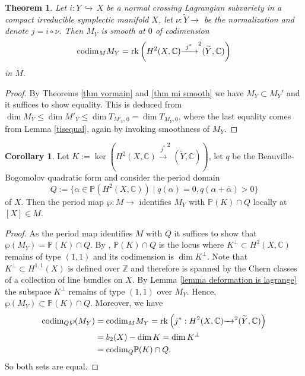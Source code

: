\documentclass[a4paper,11pt,final]{amsart}
\theoremstyle{plain}
\newtheorem{Thm}[subsection]{Theorem}
\theoremstyle{definition}
\newtheorem{Cor}[subsection]{Corollary}
\numberwithin{equation}{section}
\theoremstyle{remark}
\begin{document}
\begin{Thm}\label{thm main}
Let $i:Y {{\, \hookrightarrow\,}} X$ be a normal crossing Lagrangian subvariety in a compact irreducible symplectic manifold 
$X$, let $\nu:{{\widetilde{Y}}}{\xrightarrow{\ \ }}$ be the normalization and denote $j=i\circ\nu$. Then $M_Y$ is smooth at $0$ of codimension
\begin{equation}\label{codim}
{\operatorname{codim}}_M M_Y = {{\rm rk}}\left(H^2(X,{{\mathbb C}}) {\xrightarrow{\ j^*\ }}^2({{\widetilde{Y}}},{{\mathbb C}})\right)
\end{equation}
in $M$.
\end{Thm}
\begin{proof}
By Theorems \ref{thm vormain} and \ref{thm mi smooth} we have $M_Y \subset M_Y'$ and it suffices to show equality. This is deduced from $\dim M_Y \leq \dim M'_{Y} \leq \dim T_{M'_Y,0} = \dim T_{M_Y,0}$,
where the last equality comes from Lemma \ref{tisequal}, again by invoking smoothness of $M_Y$. 
\end{proof}
\begin{Cor}\label{cor main}
Let $K:=\ker\left(H^2(X,{{\mathbb C}}) {\xrightarrow{\ j^*\ }}^2({{\widetilde{Y}}},{{\mathbb C}})\right)$, let $q$ be the Beau\-ville-Bogomolov quadratic form and consider the period domain
\[
Q := \{\alpha \in {{\mathbb P}}(H^2(X,{{\mathbb C}}))\mid q(\alpha)=0, q(\alpha+\bar\alpha)>0\}
\]
of $X$. Then the period map $\wp:M{\xrightarrow{\ \ }}$ identifies $M_Y$ with ${{\mathbb P}}(K)\cap Q$ locally at $[X]\in M$.
\end{Cor}
\begin{proof}
As the period map identifies $M$ with $Q$ it suffices to show that $\wp(M_Y)={{\mathbb P}}(K)\cap Q$. By  \cite[1.14]{Hu99}, ${{\mathbb P}}(K)\cap Q$ is the locus where $K^\perp \subset H^2(X,{{\mathbb C}})$ remains of type $(1,1)$ and its codimension is $\dim K^\perp$. Note that $K^\perp \subset H^{1,1}(X)$ is defined over ${{\mathbb Z}}$ and therefore is spanned by the Chern classes of a collection of line bundles on $X$. 
By Lemma \ref{lemma deformation is lagrange} the subspace $K^\perp$ remains of type $(1,1)$ over $M_Y$. Hence, $\wp(M_Y) \subset {{\mathbb P}}(K)\cap Q$. Moreover, we have
\[
\begin{aligned} 
{\operatorname{codim}}_Q \wp(M_Y) &= {\operatorname{codim}}_M M_Y   = {{\rm rk}}\left(j^*:H^2(X,{{\mathbb C}}) {\xrightarrow{\ \ }}^2({{\widetilde{Y}}},{{\mathbb C}})\right) \\
&= b_2(X) - \dim K = \dim K^\perp\\
& = {\operatorname{codim}}_Q {{\mathbb P}}(K)\cap Q.
\end{aligned}
\]
So both sets are equal.
\end{proof}
\end{document}
